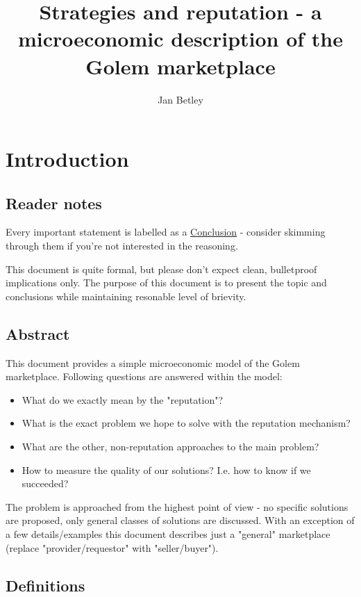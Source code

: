 \documentclass{article}
\title{Strategies and reputation - a microeconomic description of the Golem marketplace}
\author{Jan Betley}
\begin{document}
\maketitle
\section{Introduction}
\subsection{Reader notes}

Every important statement is labelled as a \underline{Conclusion} - consider skimming through them if you're not interested in the reasoning.

This document is quite formal, but please don't expect clean, bulletproof implications only. The purpose of this document is to
present the topic and conclusions while maintaining resonable level of brievity.

\subsection{Abstract}
This document provides a simple microeconomic model of the Golem marketplace. 
Following questions are answered within the model:

\begin{itemize}
\item What do we exactly mean by the "reputation"?
\item What is the exact problem we hope to solve with the reputation mechanism?
\item What are the other, non-reputation approaches to the main problem?
\item How to measure the quality of our solutions? I.e. how to know if we succeeded?
\end{itemize}


The problem is approached from the highest point of view - no specific solutions are proposed, only general classes of solutions are discussed.
With an exception of a few details/examples this document describes just a "general" marketplace (replace "provider/requestor" with "seller/buyer").

\subsection{Definitions}
\end{document}
